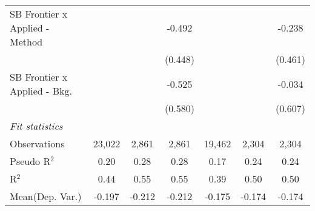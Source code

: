 \begin{tabular}{lcccccc}
   SB Frontier x Applied - Method &               &               & -0.492        &               &         & -0.238\\   
                                  &               &               & (0.448)       &               &         & (0.461)\\   
   SB Frontier x Applied - Bkg.   &               &               & -0.525        &               &         & -0.034\\   
                                  &               &               & (0.580)       &               &         & (0.607)\\   
   \midrule
   \emph{Fit statistics}\\
   Observations                   & 23,022        & 2,861         & 2,861         & 19,462        & 2,304   & 2,304\\  
   Pseudo R$^2$                   & 0.20          & 0.28          & 0.28          & 0.17          & 0.24    & 0.24\\  
   R$^2$                          & 0.44          & 0.55          & 0.55          & 0.39          & 0.50    & 0.50\\  
Mean(Dep. Var.) & -0.197 & -0.212 & -0.212 & -0.175 & -0.174 & -0.174 \\
   

\end{tabular}
